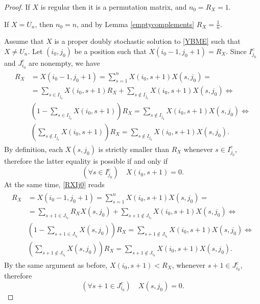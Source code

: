 \documentclass[10pt,a4paper]{amsart}
\begin{document}
	\begin{proof}
		If $X$ is regular then it is a permutation matrix, and $n_0=R_X=1$.
		
		If $X=U_n$, then $n_0=n$, and by Lemma \ref{emptycomplements} $R_X=\frac{1}{n}$. 
		
		Assume that $X$ is a proper doubly stochastic solution to \eqref{YBME} such that $X\neq U_n$. Let $(i_0,j_0)$ be a position such that $X(i_0-1,j_0+1)=R_X$. Since $I_{j_0}^c$ and $J_{i_0}^c$ are nonempty, we have
		\begin{eqnarray}\label{RXIj0}
			\begin{aligned}
				R_X&=X(i_0-1,j_0+1)=\sum_{s=1}^nX(i_0,s+1)X(s,j_0)=\\
				&=\sum_{s\in I_{j_0}}X(i_0,s+1)R_X+\sum_{s\notin I_{j_0}}X(i_0,s+1)X(s,j_0)\Leftrightarrow\\
				&\left(1-\sum_{s\in I_{j_0}}X(i_0,s+1)\right)R_X=\sum_{s\notin I_{j_0}}X(i_0,s+1)X(s,j_0)\Leftrightarrow\\
				&\left(\sum_{s\notin I_{j_0}}X(i_0,s+1)\right)R_X=\sum_{s\notin I_{j_0}}X(i_0,s+1)X(s,j_0).
			\end{aligned}
		\end{eqnarray}
		By definition, each $X(s,j_0)$ is strictly smaller than $R_X$ whenever $s\in I_{j_0}^c$, therefore the latter equality is possible if and only if 
		\begin{equation}\label{Ij0}
			\left(\forall s\in I_{j_0}^c\right)\quad X(i_0,s+1)=0.
		\end{equation}
		At the same time, \eqref{RXIj0} reads 
		\begin{eqnarray}\label{RXJi0}
			\begin{aligned}
				R_X&=X(i_0-1,j_0+1)=\sum_{s=1}^nX(i_0,s+1)X(s,j_0)=\\
				&=\sum_{s+1\in J_{i_0}}R_X X(s,j_0)+\sum_{s+1\notin J_{i_0}}X(i_0,s+1)X(s,j_0)\Leftrightarrow\\
				&\left(1-\sum_{s+1\in J_{i_0}}X(s,j_0)\right)R_X=\sum_{s+1\notin J_{i_0}}X(i_0,s+1)X(s,j_0)\Leftrightarrow\\
				&\left(\sum_{s+1\notin J_{i_0}}X(s,j_0)\right)R_X=\sum_{s+1\notin J_{i_0}}X(i_0,s+1)X(s,j_0).
			\end{aligned}
		\end{eqnarray}
		By the same argument as before, $X(i_0,s+1)<R_X$, whenever $s+1\in J_{i_0}^c$,  therefore
		\begin{equation}\label{Ji0} \left(\forall s+1\in J_{i_0}^c\right)\quad  X(s,j_0)=0.
		\end{equation}

\end{proof}
\end{document}
